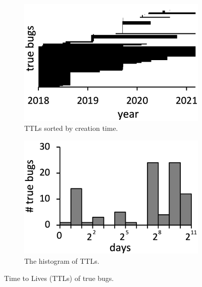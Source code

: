 \begin{figure}
  \centering
  \begin{subfigure}[b]{0.24\textwidth}
    \includegraphics[width=\textwidth]{img/ttl-chro}
    \caption{TTLs sorted by creation time.}
  \end{subfigure}
  \begin{subfigure}[b]{0.24\textwidth}
    \includegraphics[width=\textwidth]{img/ttl-count}
    \caption{The histogram of TTLs.}
  \end{subfigure}
  \caption{Time to Lives (TTLs) of true bugs.}
  \vspace*{-1.5em}
  \label{fig:ttl}
\end{figure}

